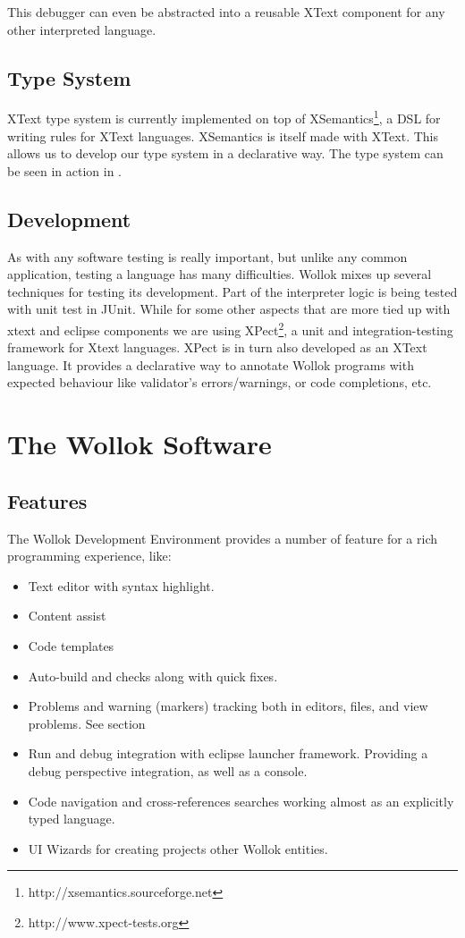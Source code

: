 This debugger can even be abstracted into a reusable XText component for any other interpreted language.

\subsection{Type System}

XText type system is currently implemented on top of XSemantics\footnote{http://xsemantics.sourceforge.net}, a DSL for writing rules for XText languages. XSemantics is itself made with XText.
This allows us to develop our type system in a declarative way. The type system can be seen in action in .

\subsection{Development}

As with any software testing is really important, but unlike any common application, testing a language has many difficulties.
Wollok mixes up several techniques for testing its development.
Part of the interpreter logic is being tested with unit test in JUnit. While for some other aspects that are more tied up with xtext and eclipse components we are using XPect\footnote{http://www.xpect-tests.org}, a unit and integration-testing framework for Xtext languages.
XPect is in turn also developed as an XText language.
It provides a declarative way to annotate Wollok programs with expected
behaviour like validator’s errors/warnings, or code completions,  etc.

\section{The Wollok Software}

\subsection{Features}

The Wollok Development Environment provides a number of feature for a rich programming experience, like:

\begin{itemize}
 \item Text editor with syntax highlight.
 \item Content assist
 \item Code templates
 \item Auto-build and checks along with quick fixes.
 \item Problems and warning (markers) tracking both in editors, files, and view problems. See section 
 \item Run and debug integration with eclipse launcher framework. Providing a debug perspective integration, as well as a console.
 \item Code navigation and cross-references searches working almost as an explicitly typed language.
 \item UI Wizards for creating projects other Wollok entities.
\end{itemize}


